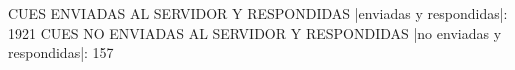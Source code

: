 CUES ENVIADAS AL SERVIDOR Y RESPONDIDAS
|enviadas y respondidas|: 1921
CUES NO ENVIADAS AL SERVIDOR Y RESPONDIDAS
|no enviadas y respondidas|: 157